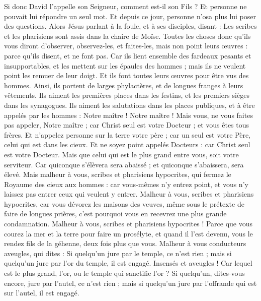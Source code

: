 \begin{multicols}{2}
Si donc David l'appelle son Seigneur, comment est-il son Fils ?
Et personne ne pouvait lui répondre un seul mot. Et depuis ce jour, personne n'osa plus lui poser des questions.
\VerseOne{}Alors Jésus parlant à la foule, et à ses disciples,
disant : Les scribes et les pharisiens sont assis dans la chaire de Moïse.
Toutes les choses donc qu’ils vous diront d’observer, observez-les, et faites-les, mais non point leurs œuvres : parce qu’ils disent, et ne font pas.
Car ils lient ensemble des fardeaux pesants et insupportables, et les mettent sur les épaules des hommes ; mais ils ne veulent point les remuer de leur doigt.
Et ils font toutes leurs œuvres pour être vus des hommes. Ainsi, ils portent de larges phylactères, et de longues franges à leurs vêtements.
Ils aiment les premières places dans les festins, et les premiers sièges dans les synagogues.
Ils aiment les salutations dans les places publiques, et à être appelés par les hommes : Notre maître ! Notre maître !
Mais vous, ne vous faites pas appeler, Notre maître ; car Christ seul est votre Docteur ; et vous êtes tous frères.
Et n'appelez personne sur la terre votre père ; car un seul est votre Père, celui qui est dans les cieux.
Et ne soyez point appelés Docteurs : car Christ seul est votre Docteur.
Mais que celui qui est le plus grand entre vous, soit votre serviteur.
Car quiconque s'élèvera sera abaissé ; et quiconque s'abaissera, sera élevé.
Mais malheur à vous, scribes et pharisiens hypocrites, qui fermez le Royaume des cieux aux hommes : car vous-mêmes n’y entrez point, et vous n’y laissez pas entrer ceux qui veulent y entrer.
Malheur à vous, scribes et pharisiens hypocrites, car vous dévorez les maisons des veuves, même sous le prétexte de faire de longues prières, c’est pourquoi vous en recevrez une plus grande condamnation.
Malheur à vous, scribes et pharisiens hypocrites ! Parce que vous courez la mer et la terre pour faire un prosélyte, et quand il l'est devenu, vous le rendez fils de la géhenne, deux fois plus que vous.
Malheur à vous conducteurs aveugles, qui dites : Si quelqu’un jure par le temple, ce n'est rien ; mais si quelqu’un jure par l'or du temple, il est engagé.
Insensés et aveugles ! Car lequel est le plus grand, l'or, ou le temple qui sanctifie l'or ?
Si quelqu’un, dites-vous encore, jure par l'autel, ce n'est rien ; mais si quelqu’un jure par l’offrande qui est sur l'autel, il est engagé.

\end{multicols}
